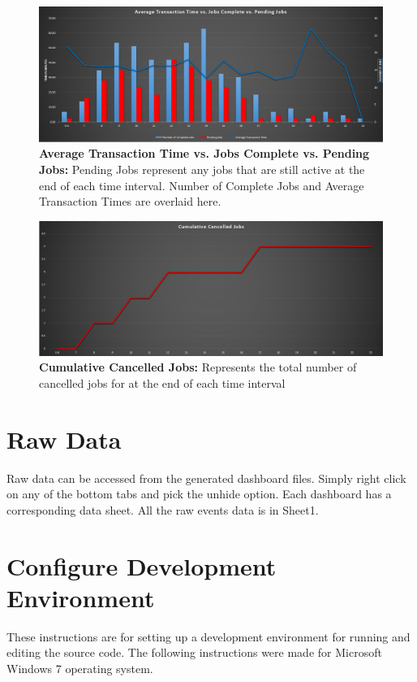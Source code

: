 \documentclass[paper=letter, fontsize=10pt]{scrartcl}
\numberwithin{equation}{section}		%
\numberwithin{figure}{section}			%
\numberwithin{table}{section}				%
\begin{document}
		\begin{figure}[!htbp]		
		\begin{center}
			\includegraphics[width=1\columnwidth, height=0.4\textheight, keepaspectratio]{comboChart.png}
			\caption{\textbf{Average Transaction Time vs. Jobs Complete vs. Pending Jobs:} Pending Jobs represent any jobs that are still active at the end of each time interval. Number of Complete Jobs and Average Transaction Times are overlaid here.}
		\end{center}
		\end{figure}
		\begin{figure}[!htbp]		
		\begin{center}
			\includegraphics[width=1\columnwidth, height=0.4\textheight, keepaspectratio]{cancelledJobs.png}
			\caption{\textbf{Cumulative Cancelled Jobs:} Represents the total number of cancelled jobs for at the end of each time interval}
		\end{center}
		\end{figure}
	
\section{Raw Data}
Raw data can be accessed from the generated dashboard files. Simply right click on any of the bottom tabs and pick the unhide option. Each dashboard has a corresponding data sheet. All the raw events data is in Sheet1. 


\section{Configure Development Environment}
These instructions are for setting up a development environment for running and editing the source code.  The following instructions were made for Microsoft Windows 7 operating system.
\end{document}
